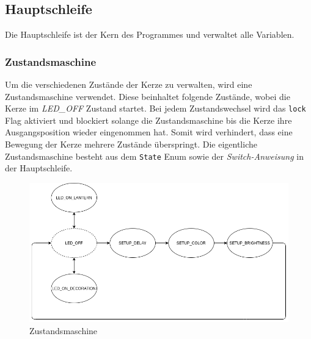 \subsection{Hauptschleife}
    Die Hauptschleife ist der Kern des Programmes und verwaltet alle Variablen.

    \subsubsection{Zustandsmaschine}\label{Zustandsmaschine}
        Um die verschiedenen Zustände der Kerze zu verwalten, wird eine 
        Zustandsmaschine verwendet. Diese beinhaltet folgende Zustände,
        wobei die Kerze im \textit{LED\_OFF} Zustand startet.
        Bei jedem Zustandswechsel wird das \texttt{lock} Flag aktiviert und
        blockiert solange die Zustandsmaschine bis die Kerze ihre
        Ausgangsposition wieder eingenommen hat. Somit wird verhindert,
        dass eine Bewegung der Kerze mehrere Zustände überspringt.
        Die eigentliche Zustandsmaschine besteht aus dem \texttt{State} Enum
        sowie der \textit{Switch-Anweisung} in der Hauptschleife.

        \begin{figure}[H]
            \centering
            \includegraphics[scale=0.5]{img/state.png}
            \caption{Zustandsmaschine}
        \end{figure}
    

